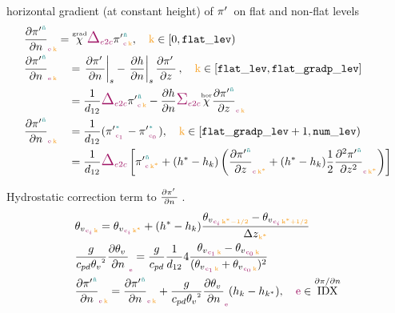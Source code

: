 horizontal gradient (at constant height) of $\exnerprime{}{}{}$ on flat and non-flat levels
\begin{align}
  &\exnerprimegradh{\ntilde}{\e}{\k} = \Cgrad \Gradn_{\offProv{e2c}} \exnerprime{\ntilde}{\c}{\k}, \quad \k \in [0, \nflatlev) \\
  &\begin{aligned}
    &\exnerprimegradh{\ntilde}{\e}{\k} &&= \left.\pdxn{\exnerprime{}{}{}}\right|_{s} - \left.\pdxn{h}\right|_{s}\exnerprimedz{}{}{}, \quad \k \in [\nflatlev, \nflatgradp]\\
    &                                  &&= \Wedge \Gradn_{\offProv{e2c}} \exnerprime{\ntilde}{\c}{\k}
                                         - \pdxn{h} \sum_{\offProv{e2c}} \Whor \exnerprimedz{\ntilde}{\c}{\k}
  \end{aligned} \\
  &\begin{aligned}
    &\exnerprimegradh{\ntilde}{\e}{\k} &&= \Wedge (\exnerprime{*}{\c_1}{} - \exnerprime{*}{\c_0}{}), \quad \k \in [\nflatgradp+1, \nlev) \\
    &                                  &&= \Wedge \Gradn_{\offProv{e2c}} \left[ \exnerprime{\ntilde}{\c}{\k^*} + \dzgradp \left( \exnerprimedz{\ntilde}{\c}{\k^*} + \dzgradp \exnerprimedzz{\ntilde}{\c}{\k^*} \right) \right]
  \end{aligned}
\end{align}

Hydrostatic correction term to $\exnerprimegradh{}{}{}$.
\begin{align}
  &\vpotemp{}{\c_i}{\k} = \vpotemp{}{\c_i}{\k^*} + \dzgradp \frac{\vpotemp{}{\c_i}{\k^*-1/2} - \vpotemp{}{\c_i}{\k^*+1/2}}{\Dz{\k^*}} \\
  &\exnhydrocorr{\e} = \frac{g}{\cpd} \Wedge 4 \frac{ \vpotemp{}{\c_1}{\k} - \vpotemp{}{\c_0}{\k} }{ (\vpotemp{}{\c_1}{\k} + \vpotemp{}{\c_0}{\k})^2 } \\
  &\exnerprimegradh{\ntilde}{\e}{\k} = \exnerprimegradh{\ntilde}{\e}{\k} + \exnhydrocorr{\e} (h_k - h_{k^*}), \quad \e \in \IDXpg
\end{align}

